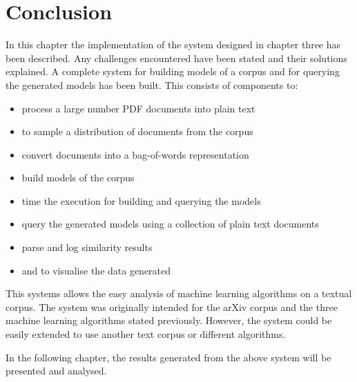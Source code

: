 \section{Conclusion}
In this chapter the implementation of the system designed in chapter three has been described.
Any challenges encountered have been stated and their solutions explained.
A complete system for building models of a corpus and for querying the generated models has been built.
This consists of components to:
\begin{itemize}
    \item process a large number PDF documents into plain text
    \item to sample a distribution of documents from the corpus
    \item convert documents into a bag-of-words representation
    \item build models of the corpus
    \item time the execution for building and querying the models
    \item query the generated models using a collection of plain text documents
    \item parse and log similarity results
    \item and to visualise the data generated
\end{itemize}
This systems allows the easy analysis of machine learning algorithms on a textual corpus.
The system was originally intended for the arXiv corpus and the three machine learning algorithms stated previously. However, the system could be easily extended to use another text corpus or different algorithms.

In the following chapter, the results generated from the above system will be presented and analysed.
